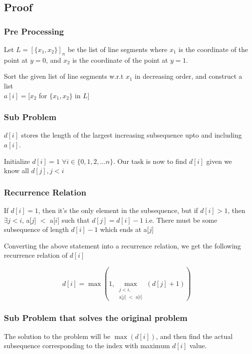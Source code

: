 \documentclass[12pt]{article}
\begin{document}
\subsection{Proof}

\subsubsection{Pre Processing}

Let $L = [\{x_1, x_2\}]_n$ be the list of line segments where $x_1$ is the coordinate of the point at $y = 0$, and $x_2$ is the coordinate of the point at $y = 1$. 

Sort the given list of line segments w.r.t $x_1$ in decreasing order, and construct a list \\ $a[i] = [x_2$ for $\{x_1, x_2\}$ in $L]$ 


\subsubsection{Sub Problem}

$d[i]$ stores the length of the largest increasing subsequence upto and including $a[i]$.

Initialize $d[i] = 1$ $\forall i \in \{0, 1, 2, \dots n\}$.
Our task is now to find $d[i]$ given we know all $d[j], j < i$


\subsubsection{Recurrence Relation} 


If $d[i] = 1$, then it's the only element in the subsequence, but if $d[i] > 1$, then $\exists j < i$, a[$j$] $<$ a[$i$] such that $d[j] = d[i] - 1$ i.e. There must be some subsequence of length $d[i] - 1$ which ends at a[$j$]


Converting the above statement into a recurrence relation, we get the following recurrence relation of $d[i]$

\[
  d[i] =  \max \left(
                    1, 
                    \max_{\substack{j < i, \\
                                    \text{a[$j$] $<$ a[$i$]}}} 
                        (d[j] + 1)
                \right)
\]

\subsubsection{Sub Problem that solves the original problem}
The solution to the problem will be $\max(d[i])$, and then find the actual subsequence corresponding to the index with maximum $d[i]$ value.
\end{document}
